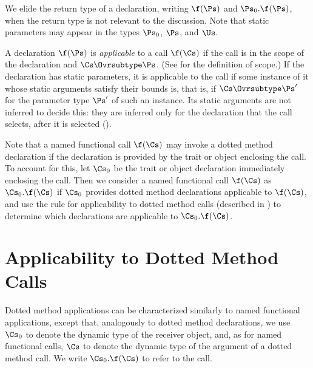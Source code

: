 We elide the return type of a declaration, writing $\f(\Ps)$ and
$\Ps_0.\f(\Ps)$, when the return type is not relevant to the
discussion.
Note that static parameters may appear in the types $\Ps_0$, $\Ps$, and $\Us$.


A declaration $\f(\Ps)$ is \emph{applicable} to a call $\f(\Cs)$
if the call is in the scope of the declaration and $\Cs \Ovrsubtype \Ps$.
(See  for the definition of scope.)
If the declaration has static parameters, it is applicable to the call if some
instance of it whose static arguments satisfy their bounds is, that is, if
$\Cs \Ovrsubtype \Ps'$ for the parameter type $\Ps'$ of such an instance.
Its static arguments are not inferred to decide this: they are inferred only for
the declaration that the call selects, after it is selected
().



Note that a named functional call $\f(\Cs)$ may invoke a dotted method
declaration if the declaration is provided by the trait or object
enclosing the call.  To account for this, let $\Cs_0$ be the trait or
object declaration immediately enclosing the call.
%
Then we consider a named functional call $\f(\Cs)$ as $\Cs_0.\f(\Cs)$
if $\Cs_0$ provides dotted method declarations applicable to $\f(\Cs)$, and
use the rule for applicability to dotted method calls (described in
) to determine which declarations
are applicable to $\Cs_0.\f(\Cs)$.



\section{Applicability to Dotted Method Calls}

Dotted method applications can be characterized similarly to named
functional applications, except that, analogously to dotted method declarations,
we use $\Cs_0$ to denote the dynamic type of the receiver object,
and, as for named functional calls, $\Cs$ to denote the dynamic
type of the argument of a  dotted method call.
We write $\Cs_0.\f(\Cs)$ to refer to the  call.

